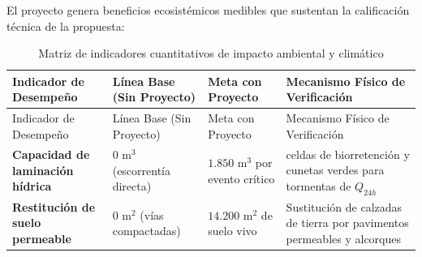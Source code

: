 \documentclass[
  spanish,
  letterpaper,
  DIV=11,
  numbers=noendperiod]{scrartcl}
\begin{document}
El proyecto genera beneficios ecosistémicos medibles que sustentan la
calificación técnica de la propuesta:

\begin{longtable}[]{@{}
  >{\raggedright\arraybackslash}p{}
  >{\raggedright\arraybackslash}p{}
  >{\raggedright\arraybackslash}p{}
  >{\raggedright\arraybackslash}p{}@{}}
\caption{Matriz de indicadores cuantitativos de impacto ambiental y
climático}\label{tbl-metricas-climaticas}\tabularnewline
\toprule\noalign{}
\begin{minipage}[b]{\linewidth}\raggedright
Indicador de Desempeño
\end{minipage} & \begin{minipage}[b]{\linewidth}\raggedright
Línea Base (Sin Proyecto)
\end{minipage} & \begin{minipage}[b]{\linewidth}\raggedright
Meta con Proyecto
\end{minipage} & \begin{minipage}[b]{\linewidth}\raggedright
Mecanismo Físico de Verificación
\end{minipage} \\
\midrule\noalign{}
\endfirsthead
\toprule\noalign{}
\begin{minipage}[b]{\linewidth}\raggedright
Indicador de Desempeño
\end{minipage} & \begin{minipage}[b]{\linewidth}\raggedright
Línea Base (Sin Proyecto)
\end{minipage} & \begin{minipage}[b]{\linewidth}\raggedright
Meta con Proyecto
\end{minipage} & \begin{minipage}[b]{\linewidth}\raggedright
Mecanismo Físico de Verificación
\end{minipage} \\
\midrule\noalign{}
\endhead
\bottomrule\noalign{}
\endlastfoot
\textbf{Capacidad de laminación hídrica} & \(0 \text{ m}^3\)
(escorrentía directa) & \(1.850 \text{ m}^3\) por evento crítico & 8
celdas de biorretención y cunetas verdes para tormentas de
\(Q_{24h}\) \\
\textbf{Restitución de suelo permeable} & \(0 \text{ m}^2\) (vías
compactadas) & \(14.200 \text{ m}^2\) de suelo vivo & Sustitución de
calzadas de tierra por pavimentos permeables y alcorques \\

\end{longtable}
\end{document}
